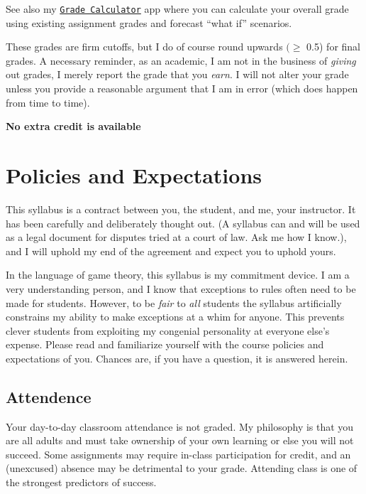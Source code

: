\documentclass{article}
\begin{document}
See also my
\href{https://ryansafner.shinyapps.io/306_grade_calculator/}{
\texttt{Grade\ Calculator}} app where you can calculate your overall
grade using existing assignment grades and forecast ``what if''
scenarios.

These grades are firm cutoffs, but I do of course round upwards
\((\geq\) 0.5) for final grades. A necessary reminder, as an academic, I
am not in the business of \emph{giving} out grades, I merely report the
grade that you \emph{earn}. I will not alter your grade unless you
provide a reasonable argument that I am in error (which does happen from
time to time).

\textbf{No extra credit is available}

\hypertarget{policies-and-expectations}{%
\section{Policies and Expectations}\label{policies-and-expectations}}

This syllabus is a contract between you, the student, and me, your
instructor. It has been carefully and deliberately thought out. (A
syllabus can and will be used as a legal document for disputes tried at
a court of law. Ask me how I know.), and I will uphold my end of the
agreement and expect you to uphold yours.

In the language of game theory, this syllabus is my commitment device. I
am a very understanding person, and I know that exceptions to rules
often need to be made for students. However, to be \emph{fair} to
\emph{all} students the syllabus artificially constrains my ability to
make exceptions at a whim for anyone. This prevents clever students from
exploiting my congenial personality at everyone else's expense. Please
read and familiarize yourself with the course policies and expectations
of you. Chances are, if you have a question, it is answered herein.

\hypertarget{attendence}{%
\subsection{Attendence}\label{attendence}}

Your day-to-day classroom attendance is not graded. My philosophy is
that you are all adults and must take ownership of your own learning or
else you will not succeed. Some assignments may require in-class
participation for credit, and an (unexcused) absence may be detrimental
to your grade. Attending class is one of the strongest predictors of
success.
\end{document}
